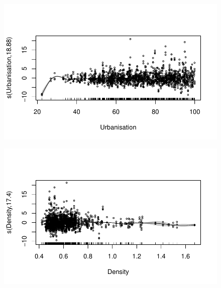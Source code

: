 \documentclass[
  letterpaper,
  DIV=11,
  numbers=noendperiod]{scrartcl}
\begin{document}
\begin{figure}[H]

{\centering \includegraphics{Group34Coursework_files/figure-pdf/unnamed-chunk-10-3.pdf}

}

\end{figure}

\begin{figure}[H]

{\centering \includegraphics{Group34Coursework_files/figure-pdf/unnamed-chunk-10-4.pdf}

}

\end{figure}
\end{document}

